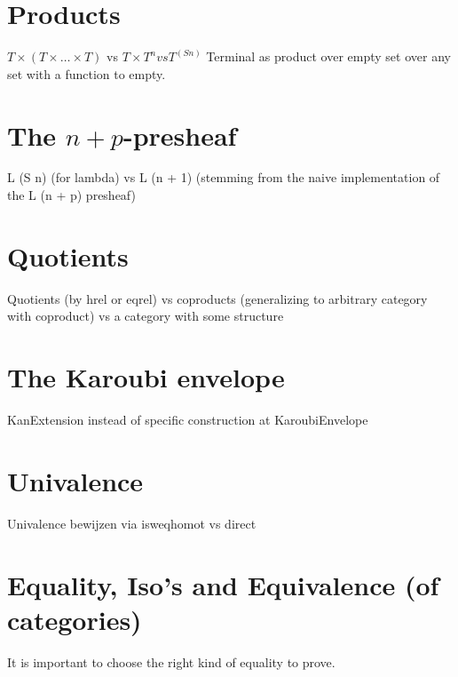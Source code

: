 \section{Products}
$ T \times (T \times \dots \times T) $ vs $ T \times T^n vs T^(S n) $
Terminal as product over empty set
over any set with a function to empty.

\section{The \texorpdfstring{$ n + p $}{n + p}-presheaf}
L (S n) (for lambda) vs L (n + 1) (stemming from the naive implementation of the L (n + p) presheaf)

\section{Quotients}
Quotients (by hrel or eqrel) vs coproducts (generalizing to arbitrary category with coproduct) vs a category with some structure

\section{The Karoubi envelope}
KanExtension instead of specific construction at KaroubiEnvelope

\section{Univalence}
Univalence bewijzen via isweqhomot vs direct

\section{Equality, Iso's and Equivalence (of categories)}
It is important to choose the right kind of equality to prove.
